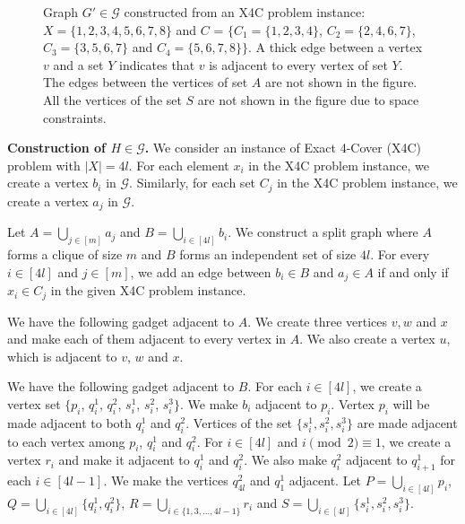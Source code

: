 \documentclass[preprint,12pt]{elsarticle}
\newcommand{\xfc}{{\sc Exact 4-Cover}}
\begin{document}
\begin{figure}[t]
\begin{tikzpicture} [thick,scale=0.75, every node/.style={scale=1}]
    \end{tikzpicture}
        \caption{Graph $G' \in \mathcal{G}$ constructed from an X4C problem instance: $X = \{1,2,3,4,5,6, 7, 8\}$ and $C$ = $\{C_1 =  \{1,2,3,4\}$, $C_2 =  \{2,4,6,7\}$, $C_3 =  \{3,5,6,7\}$ and $C_4 =  \{5,6,7,8\}\}$. A thick edge between a vertex $v$ and a set $Y$ indicates that $v$ is adjacent to every vertex of set $Y$. The edges between the vertices of set $A$ are not shown in the figure. All the vertices of the set $S$ are not shown in the figure due to space constraints. }
    \label{fig:fig2}
\end{figure} 
\medskip
\noindent \textbf{Construction of $H \in \mathcal{G}$. }We consider an instance of \xfc{} (X4C) problem with $|X| = 4l$. For each element $x_i$ in the X4C problem instance, we create a vertex $b_i$ in $\mathcal{G}$. Similarly, for each set $C_j$ in the X4C problem instance, we create a vertex $a_j$ in $\mathcal{G}$. 

Let $A = \bigcup\limits_{j \in [m]} a_j$ and $B = \bigcup\limits_{i \in [4l]} b_i$. We construct a split graph where $A$ forms a clique of size $m$ and $B$ forms an independent set of size $4l$.
For every $i\in [4l]$ and $j \in [m]$, we add an edge between $b_i\in B$ and $a_j \in A$ if and only if $x_i \in C_j$ in the given X4C problem instance.


We have the following gadget adjacent to $A$. We create three vertices $v, w$ and $x$ and make each of them adjacent to every vertex in $A$. We also create a vertex $u$, which is adjacent to $v$, $w$ and $x$.

We have the following gadget adjacent to $B$. For each $i \in [4l]$, we create a vertex set $\{p_i$, $q_i^1$, $q_i^2$, $s_i^1$, $s_i^2$, $s_i^3\}$. We make $b_i$ adjacent to $p_i$. Vertex $p_i$ will be made adjacent to both $q_i^1$ and $q_i^2$. Vertices of the set $\{s_i^1, s_i^2, s_i^3\}$ are made adjacent to each vertex among $p_i$, $q_i^1$ and $q_i^2$. For $i \in [4l]$ and $i \pmod 2 \equiv 1$, we create a vertex $r_i$ and make it adjacent to $q_i^1$ and $q_i^2$. We also make $q_i^2$ adjacent to $q_{i+1}^1$ for each $i \in [4l-1]$. We make the vertices $q_{4l}^2$ and $q_1^1$ adjacent. Let $P = \bigcup\limits_{i \in [4l]} p_i$, $Q = \bigcup\limits_{i \in [4l]} \{q_i^1, q_i^2\}$, $R = \bigcup\limits_{i \in \{1,3,...,4l-1\}} r_i$ and $S = \bigcup\limits_{i \in [4l]} \{s_i^1, s_i^2, s_i^3\}$.
\end{document}
